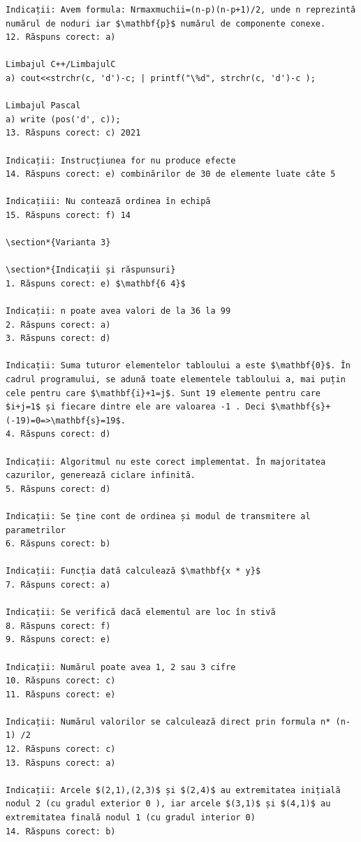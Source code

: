 \documentclass[10pt]{article}
\begin{document}
\begin{verbatim}
Indicații: Avem formula: Nrmaxmuchii=(n-p)(n-p+1)/2, unde n reprezintă numărul de noduri iar $\mathbf{p}$ numărul de componente conexe.
12. Răspuns corect: a)

Limbajul C++/LimbajulC
a) cout<<strchr(c, 'd')-c; | printf("\%d", strchr(c, 'd')-c );

Limbajul Pascal
a) write (pos('d', c));
13. Răspuns corect: c) 2021

Indicații: Instrucțiunea for nu produce efecte
14. Răspuns corect: e) combinărilor de 30 de elemente luate câte 5

Indicațiii: Nu contează ordinea în echipă
15. Răspuns corect: f) 14

\section*{Varianta 3}

\section*{Indicații și răspunsuri}
1. Răspuns corect: e) $\mathbf{6 4}$

Indicații: n poate avea valori de la 36 la 99
2. Răspuns corect: a)
3. Răspuns corect: d)

Indicații: Suma tuturor elementelor tabloului a este $\mathbf{0}$. În cadrul programului, se adună toate elementele tabloului a, mai puțin cele pentru care $\mathbf{i}+1=j$. Sunt 19 elemente pentru care $i+j=1$ și fiecare dintre ele are valoarea -1 . Deci $\mathbf{s}+(-19)=0=>\mathbf{s}=19$.
4. Răspuns corect: d)

Indicații: Algoritmul nu este corect implementat. În majoritatea cazurilor, generează ciclare infinită.
5. Răspuns corect: d)

Indicații: Se ține cont de ordinea și modul de transmitere al parametrilor
6. Răspuns corect: b)

Indicații: Funcția dată calculează $\mathbf{x * y}$
7. Răspuns corect: a)

Indicații: Se verifică dacă elementul are loc în stivă
8. Răspuns corect: f)
9. Răspuns corect: e)

Indicații: Numărul poate avea 1, 2 sau 3 cifre
10. Răspuns corect: c)
11. Răspuns corect: e)

Indicații: Numărul valorilor se calculează direct prin formula n* (n-1) /2
12. Răspuns corect: c)
13. Răspuns corect: a)

Indicații: Arcele $(2,1),(2,3)$ și $(2,4)$ au extremitatea inițială nodul 2 (cu gradul exterior 0 ), iar arcele $(3,1)$ și $(4,1)$ au extremitatea finală nodul 1 (cu gradul interior 0)
14. Răspuns corect: b)


\end{verbatim}
\end{document}
